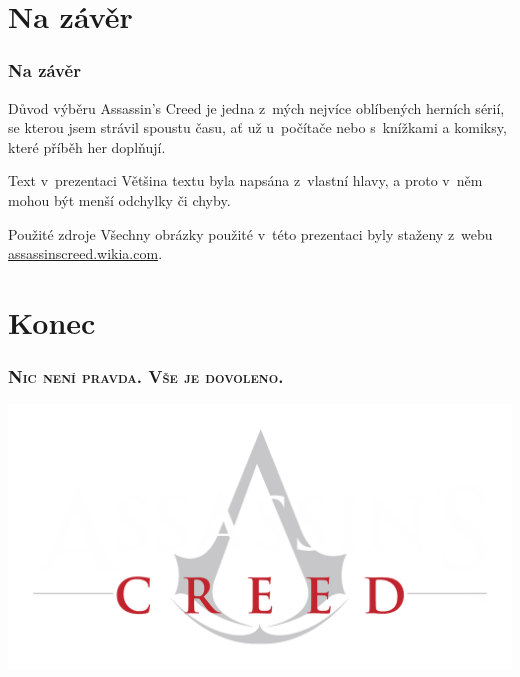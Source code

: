 \documentclass[hyperref={colorlinks, linkcolor=white, urlcolor=green!50!black}]{beamer}
\begin{document}
\section{Na závěr}

\begin{frame}
\frametitle{Na závěr}
\begin{alertblock}{Důvod výběru}
	Assassin's Creed je jedna z~mých nejvíce oblíbených herních sérií, se kterou jsem strávil spoustu času, ať už u~počítače nebo s~knížkami a komiksy, které příběh her doplňují.
\end{alertblock}
\begin{block}{Text v~prezentaci}
	Většina textu byla napsána z~vlastní hlavy, a proto v~něm mohou být menší odchylky či chyby. %
\end{block}
\begin{exampleblock}{Použité zdroje}
	Všechny obrázky použité v~této prezentaci byly staženy z~webu \href{http://assassinscreed.wikia.com}{assassinscreed.wikia.com}.
\end{exampleblock}
\end{frame}

\section{Konec}

\begin{frame}
\frametitle{\hspace*{\fill} \textbf{\textsc{Nic není pravda. Vše je dovoleno.}} \hspace*{\fill}}
\includegraphics[width=\textwidth]{logo_ac_white}
\end{frame}
\end{document}
